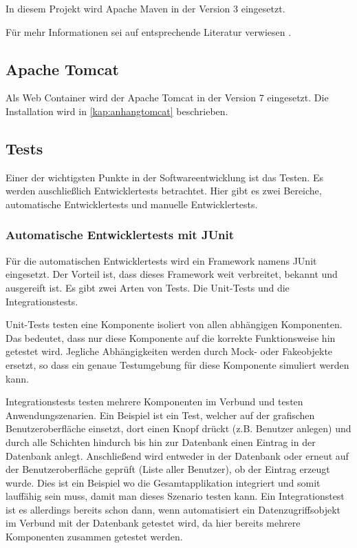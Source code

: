 In diesem Projekt wird Apache Maven in der Version 3 eingesetzt. 

Für mehr Informationen sei auf entsprechende Literatur verwiesen \citep[vgl.][]{Mitp-Verlag}.

\subsection{Apache Tomcat}
Als Web Container wird der \gls{Apache Tomcat} in der Version 7 eingesetzt. Die Installation wird in 
\autoref{kap:anhangtomcat} beschrieben. 
 
\subsection{Tests}

Einer der wichtigsten Punkte in der Softwareentwicklung ist das Testen. Es werden auschließlich Entwicklertests betrachtet. Hier gibt es zwei Bereiche, automatische Entwicklertests und manuelle Entwicklertests. 

\subsubsection{Automatische Entwicklertests mit JUnit}

Für die automatischen Entwicklertests wird ein Framework namens JUnit eingesetzt. Der Vorteil ist, dass dieses Framework weit verbreitet, bekannt und ausgereift ist. 
Es gibt zwei Arten von Tests. Die \glspl{Unit-Test} und die \glspl{Integrationstest}. 

\glspl{Unit-Test} testen eine Komponente isoliert von allen abhängigen Komponenten. Das bedeutet, dass nur diese Komponente auf die korrekte Funktionsweise hin getestet wird. Jegliche Abhängigkeiten werden durch Mock- oder Fakeobjekte ersetzt, so dass ein genaue Testumgebung für diese Komponente simuliert werden kann. 

\glspl{Integrationstest} testen mehrere Komponenten im Verbund und testen Anwendungszenarien. Ein Beispiel ist ein Test, welcher auf der grafischen Benutzeroberfläche einsetzt, dort einen Knopf drückt (z.B. Benutzer anlegen) und durch alle Schichten hindurch bis hin zur Datenbank einen Eintrag in der Datenbank anlegt. Anschließend wird entweder in der Datenbank oder erneut auf der Benutzeroberfläche geprüft (Liste aller Benutzer), ob der Eintrag erzeugt wurde. 
Dies ist ein Beispiel wo die Gesamtapplikation integriert und somit lauffähig sein muss, damit man dieses Szenario testen kann. 
Ein Integrationstest ist es allerdings bereits schon dann, wenn automatisiert ein Datenzugriffsobjekt im Verbund mit der Datenbank getestet wird, da hier bereits mehrere Komponenten zusammen getestet werden. 


